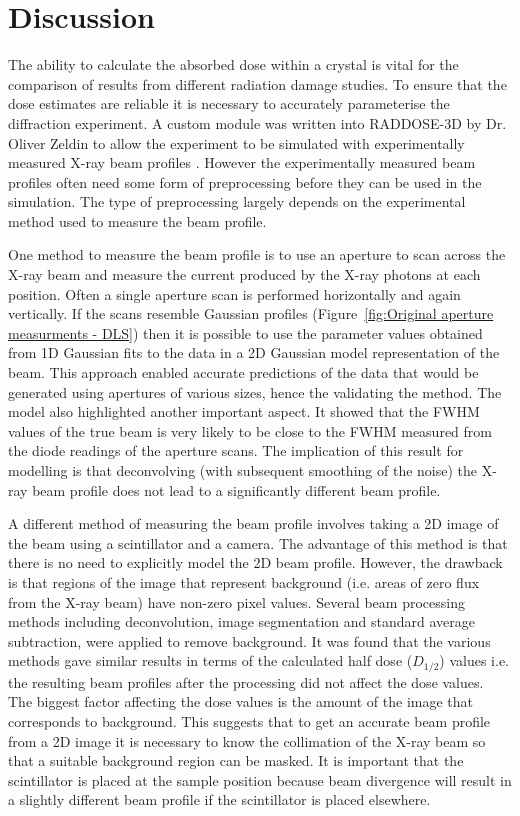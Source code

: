 \section{Discussion}
\label{sec:Discussion - Beam Chapter}
The ability to calculate the absorbed dose within a crystal is vital for the comparison of results from different radiation damage studies.
To ensure that the dose estimates are reliable it is necessary to accurately parameterise the diffraction experiment.
A custom module was written into RADDOSE-3D by Dr. Oliver Zeldin to allow the experiment to be simulated with experimentally measured X-ray beam profiles \cite{zeldin2013dwd}.
However the experimentally measured beam profiles often need some form of preprocessing before they can be used in the simulation.
The type of preprocessing largely depends on the experimental method used to measure the beam profile.

One method to measure the beam profile is to use an aperture to scan across the X-ray beam and measure the current produced by the X-ray photons at each position.
Often a single aperture scan is performed horizontally and again vertically.
If the scans resemble Gaussian profiles (Figure~\ref{fig:Original aperture measurments - DLS}) then it is possible to use the parameter values obtained from 1D Gaussian fits to the data in a 2D Gaussian model representation of the beam.
This approach enabled accurate predictions of the data that would be generated using apertures of various sizes, hence the validating the method.
The model also highlighted another important aspect.
It showed that the FWHM values of the true beam is very likely to be close to the FWHM measured from the diode readings of the aperture scans.
The implication of this result for modelling is that deconvolving (with subsequent smoothing of the noise) the X-ray beam profile does not lead to a significantly different beam profile.

A different method of measuring the beam profile involves taking a 2D image of the beam using a scintillator and a camera.
The advantage of this method is that there is no need to explicitly model the 2D beam profile.
However, the drawback is that regions of the image that represent background (i.e. areas of zero flux from the X-ray beam) have non-zero pixel values.
Several beam processing methods including deconvolution, image segmentation and standard average subtraction, were applied to remove background.
It was found that the various methods gave similar results in terms of the calculated half dose ($D_{1/2}$) values i.e. the resulting beam profiles after the processing did not affect the dose values.
The biggest factor affecting the dose values is the amount of the image that corresponds to background.
This suggests that to get an accurate beam profile from a 2D image it is necessary to know the collimation of the X-ray beam so that a suitable background region can be masked.
It is important that the scintillator is placed at the sample position because beam divergence will result in a slightly different beam profile if the scintillator is placed elsewhere.

